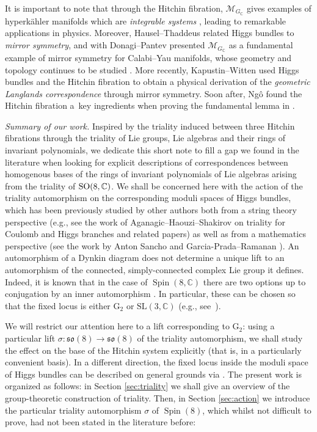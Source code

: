 \documentclass[pdftex]{sigma}
\numberwithin{equation}{section}
\def\C{{\mathbb C}}
\newcommand{\SL}{{\mathrm{SL}}}
\begin{document}
It is important to note that through the Hitchin fibration, $\mathcal{M}_{ G_\mathbb{C}}$ gives examples of hyperk\"ahler manifolds which are {\it integrable systems} \cite{N2}, leading to remarkable applications in physics.
Moreover, Hausel--Thaddeus \cite{Tamas1} related Higgs bundles to {\it mirror symmetry}, and with Donagi--Pantev presented $\mathcal{M}_{ G_\mathbb{C}}$ as a fundamental example of mirror symmetry for Calabi--Yau manifolds, whose geometry and topology continues to be studied \cite{dopa}. More recently, Kapustin--Witten \cite{Kap} used Higgs bundles and the Hitchin fibration to obtain a physical derivation of the {\it geometric Langlands correspondence} through mirror symmetry. Soon after, Ng\^{o} found the Hitchin fibration a~key ingredients when proving the fundamental lemma in \cite{ngo}.

{\it Summary of our work.} Inspired by the triality induced between three Hitchin fibrations through the triality of Lie groups, Lie algebras and their rings of invariant polynomials, we dedicate this short note to fill a gap we found in the literature when looking for explicit descriptions of correspondences between homogenous bases of the rings of invariant polynomials of Lie algebras arising from the triality of ${\rm SO}(8,\mathbb{C})$. We shall be concerned here with the action of the triality automorphism on the corresponding moduli spaces of Higgs bundles, which has been previously studied by other authors both from a string theory perspective (e.g., see the work of Aganagic--Haouzi--Shakirov \cite{mina} on triality for Coulomb and Higgs branches and related papers) as well as from a mathematics perspective (see the work by Anton Sancho \cite{anton} and Garcia-Prada--Ramanan \cite{oscar}). An automorphism of a Dynkin diagram does not determine a unique lift to an automorphism of the connected, simply-connected complex Lie group it defines. Indeed, it is known that in the case of $\operatorname{Spin}(8, \mathbb{C})$ there are two options up to conjugation by an inner automorphism \cite{wolf-gray}. In particular, these can be chosen so that the fixed locus is either $\mathrm{G}_2$ or $\SL (3, \C )$ (e.g., see~\cite{anton,oscar}).

We will restrict our attention here to a lift corresponding to $\mathrm{G}_2$: using a particular lift $\sigma\colon \mathfrak{so}(8) \to \mathfrak{so}(8)$ of the triality automorphism, we shall study the effect on the base of the Hitchin system explicitly (that is, in a particularly convenient basis). In a different direction, the fixed locus inside the moduli space of Higgs bundles can be described on general grounds via \cite{oscar}. The present work is organized as follows: in Section \ref{sec:triality} we shall give an overview of the group-theoretic construction of triality. Then, in Section \ref{sec:action} we introduce the particular triality automorphism $\sigma$ of $\operatorname{Spin}(8)$, which whilst not difficult to prove, had not been stated in the literature before:
\end{document}
